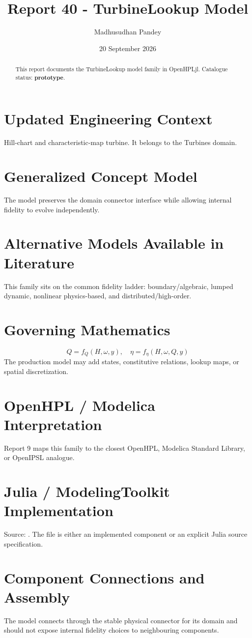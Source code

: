 \documentclass[10pt,a4paper]{article}
\title{Report 40 - TurbineLookup Model}
\author{Madhusudhan Pandey}
\date{20 September 2026}
\begin{document}
\maketitle
\begin{abstract}This report documents the TurbineLookup model family in OpenHPLjl. Catalogue status: \textbf{prototype}.\end{abstract}
\section{Updated Engineering Context}Hill-chart and characteristic-map turbine. It belongs to the Turbines domain.
\section{Generalized Concept Model}The model preserves the domain connector interface while allowing internal fidelity to evolve independently.
\section{Alternative Models Available in Literature}This family sits on the common fidelity ladder: boundary/algebraic, lumped dynamic, nonlinear physics-based, and distributed/high-order.
\section{Governing Mathematics}\[Q=f_Q(H,\omega,y),\quad \eta=f_\eta(H,\omega,Q,y)\]The production model may add states, constitutive relations, lookup maps, or spatial discretization.
\section{OpenHPL / Modelica Interpretation}Report 9 maps this family to the closest OpenHPL, Modelica Standard Library, or OpenIPSL analogue.
\section{Julia / ModelingToolkit Implementation}Source: \texttt{}. The file is either an implemented component or an explicit Julia source specification.
\section{Component Connections and Assembly}The model connects through the stable physical connector for its domain and should not expose internal fidelity choices to neighbouring components.
\end{document}
